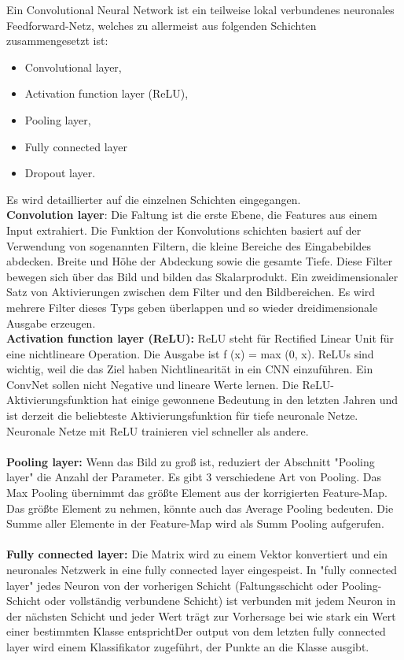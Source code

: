 \documentclass[a4paper,11pt]{article}
\theoremstyle{mytheor}
\begin{document}
Ein Convolutional Neural Network ist ein teilweise lokal verbundenes neuronales Feedforward-Netz, welches zu allermeist aus folgenden Schichten zusammengesetzt ist:
\begin{itemize}
\item Convolutional layer,
\item Activation function layer (ReLU),
\item Pooling layer,
\item Fully connected layer 
\item Dropout layer.
\end{itemize}
Es wird detaillierter auf die einzelnen Schichten eingegangen.\\
\textbf{Convolution layer}: Die Faltung ist die erste Ebene, die Features aus einem Input extrahiert. Die Funktion der Konvolutions schichten basiert auf der Verwendung von sogenannten Filtern, die kleine Bereiche des Eingabebildes abdecken. Breite und Höhe der Abdeckung sowie die gesamte Tiefe. Diese Filter bewegen sich über das Bild und bilden das Skalarprodukt. Ein zweidimensionaler Satz von Aktivierungen zwischen dem Filter und den Bildbereichen. Es wird mehrere Filter dieses Typs geben überlappen und so wieder dreidimensionale Ausgabe erzeugen.
\\ \textbf{Activation function layer (ReLU): }ReLU steht für Rectified Linear Unit für eine nichtlineare Operation. Die Ausgabe ist ƒ (x) = max (0, x). ReLUs sind wichtig, weil die das Ziel haben Nichtlinearität in ein CNN einzuführen. Ein ConvNet sollen nicht Negative und lineare Werte lernen. Die ReLU-Aktivierungsfunktion hat einige gewonnene
Bedeutung in den letzten Jahren und ist derzeit die beliebteste Aktivierungsfunktion
für tiefe neuronale Netze. Neuronale Netze mit ReLU trainieren viel schneller als andere.\\
\\ \textbf{Pooling layer: }Wenn das Bild zu groß ist, reduziert der Abschnitt "Pooling layer" die Anzahl der Parameter. Es gibt 3 verschiedene Art von Pooling. Das Max Pooling übernimmt das größte Element aus der korrigierten Feature-Map. Das größte Element zu nehmen, könnte auch das Average Pooling bedeuten. Die Summe aller Elemente in der Feature-Map wird als Summ Pooling aufgerufen.\\
\\ \textbf{Fully connected layer: }Die Matrix wird zu einem Vektor konvertiert  und ein neuronales Netzwerk in eine fully connected layer eingespeist. In "fully connected layer" jedes Neuron von der vorherigen Schicht (Faltungsschicht oder Pooling-Schicht oder vollständig verbundene Schicht) ist verbunden mit jedem Neuron in der nächsten Schicht und jeder Wert trägt zur Vorhersage bei wie stark ein Wert einer bestimmten Klasse entsprichtDer output von dem letzten fully connected layer wird einem Klassifikator zugeführt, der Punkte an die Klasse ausgibt.\\
\end{document}
